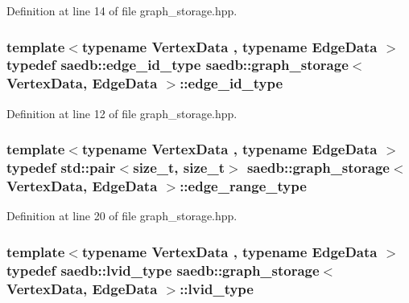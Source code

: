 Definition at line 14 of file graph\-\_\-storage.\-hpp.

\hypertarget{classsaedb_1_1graph__storage_a7861f26a1e724120e58d9feba4da37a1}{
\subsubsection[{edge\-\_\-id\-\_\-type}]{\setlength{\rightskip}{0pt plus 5cm}template$<$typename Vertex\-Data , typename Edge\-Data $>$ typedef {\bf saedb\-::edge\-\_\-id\-\_\-type} {\bf saedb\-::graph\-\_\-storage}$<$ Vertex\-Data, Edge\-Data $>$\-::{\bf edge\-\_\-id\-\_\-type}}}\label{db/dd8/classsaedb_1_1graph__storage_a7861f26a1e724120e58d9feba4da37a1}


Definition at line 12 of file graph\-\_\-storage.\-hpp.

\hypertarget{classsaedb_1_1graph__storage_ab8051ded6bd20175a58af976d3a1ee23}{
\subsubsection[{edge\-\_\-range\-\_\-type}]{\setlength{\rightskip}{0pt plus 5cm}template$<$typename Vertex\-Data , typename Edge\-Data $>$ typedef std\-::pair$<$size\-\_\-t, size\-\_\-t$>$ {\bf saedb\-::graph\-\_\-storage}$<$ Vertex\-Data, Edge\-Data $>$\-::{\bf edge\-\_\-range\-\_\-type}}}\label{db/dd8/classsaedb_1_1graph__storage_ab8051ded6bd20175a58af976d3a1ee23}


Definition at line 20 of file graph\-\_\-storage.\-hpp.

\hypertarget{classsaedb_1_1graph__storage_a147a907accd64bb1f803a423d04dd04b}{
\subsubsection[{lvid\-\_\-type}]{\setlength{\rightskip}{0pt plus 5cm}template$<$typename Vertex\-Data , typename Edge\-Data $>$ typedef {\bf saedb\-::lvid\-\_\-type} {\bf saedb\-::graph\-\_\-storage}$<$ Vertex\-Data, Edge\-Data $>$\-::{\bf lvid\-\_\-type}}}\label{db/dd8/classsaedb_1_1graph__storage_a147a907accd64bb1f803a423d04dd04b}


